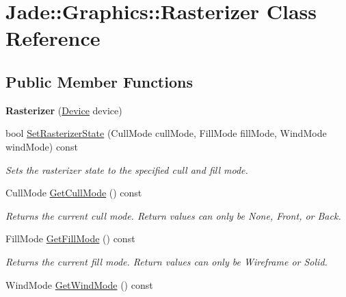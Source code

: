\hypertarget{class_jade_1_1_graphics_1_1_rasterizer}{}\section{Jade\+:\+:Graphics\+:\+:Rasterizer Class Reference}
\label{class_jade_1_1_graphics_1_1_rasterizer}
\subsection*{Public Member Functions}
\begin{DoxyCompactItemize}
\item 
\hypertarget{class_jade_1_1_graphics_1_1_rasterizer_a4aa26ad8f6501e4adfcde35d351fc176}{}{\bfseries Rasterizer} (\hyperlink{class_jade_1_1_graphics_1_1_device}{Device} device)\label{class_jade_1_1_graphics_1_1_rasterizer_a4aa26ad8f6501e4adfcde35d351fc176}

\item 
bool \hyperlink{class_jade_1_1_graphics_1_1_rasterizer_aa4dfe961881a063f3e7e0b3e2a03500a}{Set\+Rasterizer\+State} (Cull\+Mode cull\+Mode, Fill\+Mode fill\+Mode, Wind\+Mode wind\+Mode) const 
\begin{DoxyCompactList}\small\item\em Sets the rasterizer state to the specified cull and fill mode. \end{DoxyCompactList}\item 
\hypertarget{class_jade_1_1_graphics_1_1_rasterizer_a6b64516bb21e19638f6e9b1d5d600d97}{}Cull\+Mode \hyperlink{class_jade_1_1_graphics_1_1_rasterizer_a6b64516bb21e19638f6e9b1d5d600d97}{Get\+Cull\+Mode} () const \label{class_jade_1_1_graphics_1_1_rasterizer_a6b64516bb21e19638f6e9b1d5d600d97}

\begin{DoxyCompactList}\small\item\em Returns the current cull mode. Return values can only be None, Front, or Back. \end{DoxyCompactList}\item 
\hypertarget{class_jade_1_1_graphics_1_1_rasterizer_aec61b803aa6bb26e9f7002eca858e1b6}{}Fill\+Mode \hyperlink{class_jade_1_1_graphics_1_1_rasterizer_aec61b803aa6bb26e9f7002eca858e1b6}{Get\+Fill\+Mode} () const \label{class_jade_1_1_graphics_1_1_rasterizer_aec61b803aa6bb26e9f7002eca858e1b6}

\begin{DoxyCompactList}\small\item\em Returns the current fill mode. Return values can only be Wireframe or Solid. \end{DoxyCompactList}\item 
\hypertarget{class_jade_1_1_graphics_1_1_rasterizer_a67934284de71de2de67a6183fcb94734}{}Wind\+Mode \hyperlink{class_jade_1_1_graphics_1_1_rasterizer_a67934284de71de2de67a6183fcb94734}{Get\+Wind\+Mode} () const \label{class_jade_1_1_graphics_1_1_rasterizer_a67934284de71de2de67a6183fcb94734}


\end{DoxyCompactItemize}
